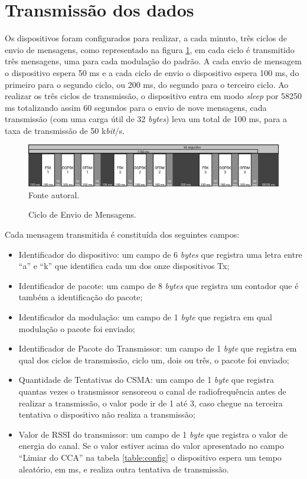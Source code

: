\section{Transmissão dos dados}
Os dispositivos foram configurados para realizar, a cada minuto, três ciclos de envio de mensagens, como representado na figura \ref{fig:ciclo_envio}, em cada ciclo é transmitido três mensagens, uma para cada modulação do padrão. A cada envio de mensagem o dispositivo espera 50 ms e a cada ciclo de envio o dispositivo espera 100 ms, do primeiro para o segundo ciclo, ou 200 ms, do segundo para o terceiro ciclo. Ao realizar os três ciclos de transmissão, o dispositivo entra em modo \emph{sleep} por 58250 ms totalizando assim 60 segundos para o envio de nove mensagens, cada transmissão (com uma carga útil de 32 \emph{bytes}) leva um total de 100 ms, para a taxa de transmissão de 50 k\emph{bit}/s.

\begin{figure}[h]
    \centering
    \caption{Ciclo de Envio de Mensagens.}
    \includegraphics[width=\textwidth]{./sections/textual/chapters/images/metodo_ciclo_envio.png}\\
    Fonte autoral.
    \label{fig:ciclo_envio}
\end{figure}

Cada mensagem transmitida é constituída dos seguintes campos:
\begin{itemize}
    \label{table:estruturaTx}
    \item Identificador do dispositivo: um campo de 6 \emph{bytes} que registra uma letra entre ``a'' e ``k'' que identifica cada um dos onze dispositivos Tx;
    \item Identificador de pacote: um campo de 8 \emph{bytes} que registra um contador que é também a identificação do pacote;
    \item Identificador da modulação: um campo de 1 \emph{byte} que registra em qual modulação o pacote foi enviado;
    \item Identificador de Pacote do Transmissor: um campo de 1 \emph{byte} que registra em qual dos ciclos de transmissão, ciclo um, dois ou três, o pacote foi enviado;
    \item Quantidade de Tentativas do CSMA: um campo de 1 \emph{byte} que registra quantas vezes o transmissor sensoreou o canal de radiofrequência antes de realizar a transmissão, o valor pode ir de 1 até 3, caso chegue na terceira tentativa o dispositivo não realiza a transmissão;
    \item Valor de RSSI do transmissor: um campo de 1 \emph{byte} que registra o valor de energia do canal. Se o valor estiver acima do valor apresentado no campo ``Limiar do CCA'' na tabela \ref{table:config} o dispositivo espera um tempo aleatório, em ms, e realiza outra tentativa de transmissão.
\end{itemize}

